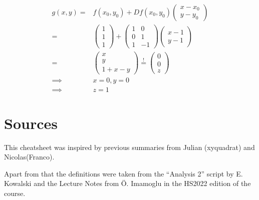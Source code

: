 \documentclass[a4paper,fontsize = 10pt]{article}
\begin{document}
\begin{align*}
g(x, y) = & f(x_0, y_0) + Df(x_0, y_0) \begin{pmatrix} x - x_0 \\ y - y_0 \end{pmatrix}\\
= & \begin{pmatrix} 1 \\ 1 \\ 1 \end{pmatrix} + \begin{pmatrix} 1 & 0 \\ 0 & 1 \\ 1 & -1 \end{pmatrix} \begin{pmatrix} x - 1 \\ y - 1 \end{pmatrix}\\
= & \begin{pmatrix} x \\ y \\ 1 + x - y \end{pmatrix} \overset{!}{=} \begin{pmatrix} 0 \\ 0 \\ z \end{pmatrix}\\
\implies & x = 0, y = 0\\
\implies & z = 1
\end{align*}


\section{Sources}
This cheatsheet was inspired by previous summaries from Julian (xyquadrat) and Nicolas(Franco). 

Apart from that the definitions were taken from the ``Analysis 2'' script by E. Kowalski and the Lecture Notes from Ö. Imamoglu in the HS2022 edition of the course.
\end{document}
